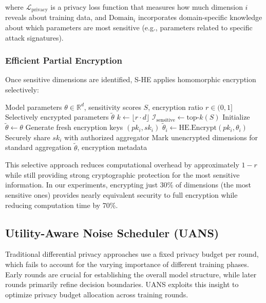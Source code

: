 \documentclass{ieeeaccess}
\theoremstyle{definition}
\begin{document}
where $\mathcal{L}_{\text{privacy}}$ is a privacy loss function that measures how much dimension $i$ reveals about training data, and $\text{Domain}_i$ incorporates domain-specific knowledge about which parameters are most sensitive (e.g., parameters related to specific attack signatures).

\subsubsection{Efficient Partial Encryption}

Once sensitive dimensions are identified, S-HE applies homomorphic encryption selectively:

\begin{algorithm}
\caption{Selective Homomorphic Encryption}
\label{alg:she}
\begin{algorithmic}[1]
\REQUIRE Model parameters $\theta \in \mathbb{R}^d$, sensitivity scores $S$, encryption ratio $r \in (0,1]$
\ENSURE Selectively encrypted parameters $\tilde{\theta}$
\STATE $k \leftarrow \lfloor r \cdot d \rfloor$ 
\STATE $\mathcal{I}_{\text{sensitive}} \leftarrow \text{top-}k(S)$ 
\STATE Initialize $\tilde{\theta} \leftarrow \theta$
    \STATE Generate fresh encryption keys $(pk_i, sk_i)$
    \STATE $\tilde{\theta}_i \leftarrow \text{HE.Encrypt}(pk_i, \theta_i)$
    \STATE Securely share $sk_i$ with authorized aggregator
\ENDFOR
\STATE Mark unencrypted dimensions for standard aggregation
\RETURN $\tilde{\theta}$, encryption metadata
\end{algorithmic}
\end{algorithm}

This selective approach reduces computational overhead by approximately $1 - r$ while still providing strong cryptographic protection for the most sensitive information. In our experiments, encrypting just 30\% of dimensions (the most sensitive ones) provides nearly equivalent security to full encryption while reducing computation time by 70\%.

\subsection{Utility-Aware Noise Scheduler (UANS)}

Traditional differential privacy approaches use a fixed privacy budget per round, which fails to account for the varying importance of different training phases. Early rounds are crucial for establishing the overall model structure, while later rounds primarily refine decision boundaries. UANS exploits this insight to optimize privacy budget allocation across training rounds.
\end{document}
